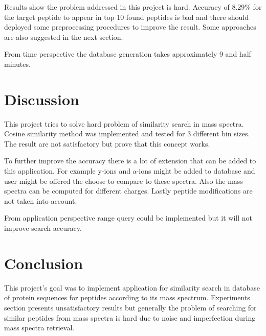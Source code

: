 \documentclass[a4paper,10pt,twocolumn]{article}
\begin{document}
Results show the problem addressed in this project is hard. Accuracy of 8.29\%
for the target peptide to appear in top 10 found peptides is bad and there
should deployed some preprocessing procedures to improve the result.
Some approaches are also suggested in the next section.

From time perspective the database generation takes approximately 9 and half
minutes.

\section{Discussion}

This project tries to solve hard problem of similarity search in mass spectra.
Cosine similarity method was implemented and tested for 3 different bin sizes.
The result are not satisfactory but prove that this concept works.

To further improve the accuracy there is a lot of extension that can be added to
this application. For example y-ions and a-ions might be added to database
and user might be offered the choose to compare to these spectra. Also the mass
spectra can be computed for different charges. Lastly peptide modifications are
not taken into account.

From application perspective range query could be implemented but it will not
improve search accuracy.

\section{Conclusion}

This project's goal was to implement application for similarity search in
database of protein sequences for peptides according to its mass spectrum.
Experiments section presents unsatisfactory results but generally the problem
of searching for similar peptides from mass spectra is hard due to noise and
imperfection during mass spectra retrieval.

{}

\end{document}
